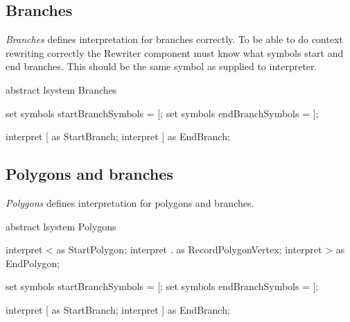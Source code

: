 

\subsection{Branches}

\lsystem \emph{Branches} defines interpretation for branches correctly.
To be able to do context rewriting correctly the Rewriter component must know what symbols start and end branches.
This should be the same symbol as supplied to interpreter.

\begin{LsystemBreak}
abstract lsystem Branches {
	set symbols startBranchSymbols = [;
	set symbols endBranchSymbols = ];

	interpret [ as StartBranch;
	interpret ] as EndBranch;
}
\end{LsystemBreak}


\subsection{Polygons and branches}

\lsystem \emph{Polygons} defines interpretation for polygons and branches.

\begin{LsystemBreak}
abstract lsystem Polygons {
	interpret < as StartPolygon;
	interpret . as RecordPolygonVertex;
	interpret > as EndPolygon;

	set symbols startBranchSymbols = [;
	set symbols endBranchSymbols = ];

	interpret [ as StartBranch;
	interpret ] as EndBranch;
}
\end{LsystemBreak}


